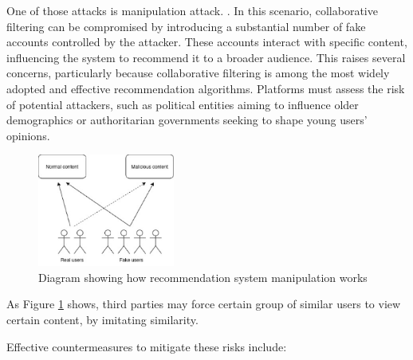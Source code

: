 \documentclass[10pt,twocolumn,twoside,a4paper]{article} %
\begin{document}
One of those attacks is manipulation attack. \cite{ManipulationAttacks}. In this scenario, collaborative filtering can be compromised by introducing a substantial number of fake accounts controlled by the attacker. These accounts interact with specific content, influencing the system to recommend it to a broader audience. This raises several concerns, particularly because collaborative filtering is among the most widely adopted and effective recommendation algorithms. Platforms must assess the risk of potential attackers, such as political entities aiming to influence older demographics or authoritarian governments seeking to shape young users' opinions.


\begin{figure}[h!]
    \centering
    \includegraphics[width=0.4\textwidth, height=0.3\textheight]{manipulation.eps}
    \caption{Diagram showing how recommendation system manipulation works}
    \label{fig:recommendation_manipulation}
\end{figure}

As Figure \ref{fig:recommendation_manipulation} shows, third parties may force certain group of similar users to view certain content, by imitating similarity.

Effective countermeasures \cite{ManipulationAttacks} to mitigate these risks include:
\end{document}
